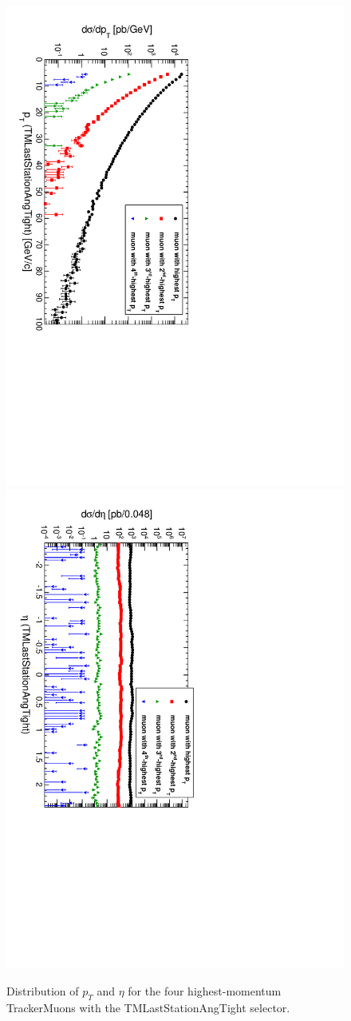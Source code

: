 \documentclass[12pt]{article}
\begin{document}
\begin{figure}
\includegraphics[height=0.5\linewidth, angle=90]{fig/backgroundsMatching_plot/ptcurves_TMLastStationAngTight.pdf}
\includegraphics[height=0.5\linewidth, angle=90]{fig/backgroundsMatching_plot/etacurves_TMLastStationAngTight.pdf}

\caption{Distribution of $p_T$ and $\eta$ for the four highest-momentum TrackerMuons with the TMLastStationAngTight selector. \label{fig:curves_TMLastStationAngTight}}
\end{figure}
\end{document}
